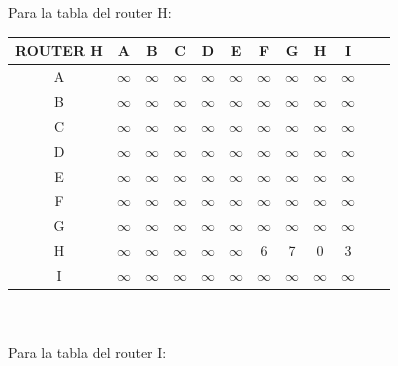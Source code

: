\documentclass{article}
\begin{document}
\\\\
Para la tabla del router H:\\
\begin{tabular}{ | c | c | c | c | c | c | c | c | c | c | c | c |}
\hline                 
ROUTER H    & A      & B      & C      & D      & E      & F      & G      & H      & I      \\
\hline
        A   &$\infty$&$\infty$&$\infty$&$\infty$&$\infty$&$\infty$&$\infty$&$\infty$&$\infty$\\
\hline
        B   &$\infty$&$\infty$&$\infty$&$\infty$&$\infty$&$\infty$&$\infty$&$\infty$&$\infty$\\
\hline
        C   &$\infty$&$\infty$&$\infty$&$\infty$&$\infty$&$\infty$&$\infty$&$\infty$&$\infty$\\
\hline
        D   &$\infty$&$\infty$&$\infty$&$\infty$&$\infty$&$\infty$&$\infty$&$\infty$&$\infty$\\
\hline
        E   &$\infty$&$\infty$&$\infty$&$\infty$&$\infty$&$\infty$&$\infty$&$\infty$&$\infty$\\
\hline
        F   &$\infty$&$\infty$&$\infty$&$\infty$&$\infty$&$\infty$&$\infty$&$\infty$&$\infty$\\
\hline
        G   &$\infty$&$\infty$&$\infty$&$\infty$&$\infty$&$\infty$&$\infty$&$\infty$&$\infty$\\
\hline
        H   &$\infty$&$\infty$&$\infty$&$\infty$&$\infty$& 6      & 7      & 0      & 3      \\
\hline 
        I   &$\infty$&$\infty$&$\infty$&$\infty$&$\infty$&$\infty$&$\infty$&$\infty$&$\infty$\\
\hline
\end{tabular}
\\\\
Para la tabla del router I:\\
\end{document}
